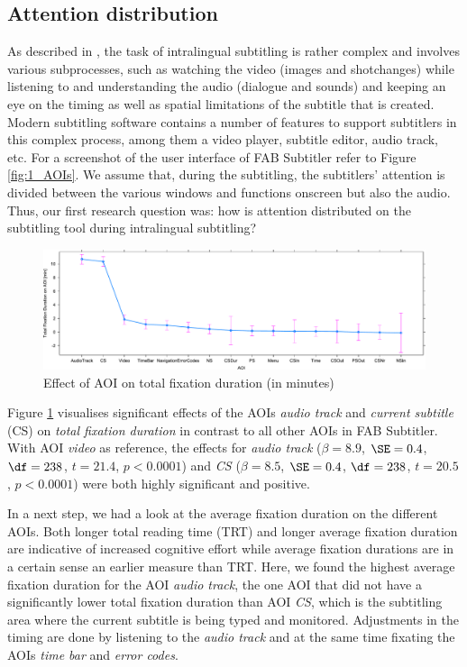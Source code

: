 \documentclass[output=paper]{langscibook}
\begin{document}
\subsection{Attention distribution}
As described in , the task of intralingual subtitling is rather complex and involves various subprocesses, such as watching the video (images and shot\linebreak changes) while listening to and understanding the audio (dialogue and sounds) and keeping an eye on the timing as well as spatial limitations of the subtitle that is created.
Modern subtitling software contains a number of features to support subtitlers in this complex process, among them a video player, subtitle editor, audio track, etc.
For a screenshot of the user interface of FAB Subtitler refer to Figure \ref{fig:1_AOIs}.
We assume that, during the subtitling, the subtitlers' attention is divided between the various windows and functions onscreen but also the audio.
Thus, our first research question was: how is attention distributed on the subtitling tool during intralingual subtitling?

\begin{figure}
\includegraphics[width=1\textwidth]{figures/LME1_TotalFixDur_AOI.pdf}
%
\caption{Effect of AOI on total fixation duration (in minutes)\label{fig:3_LME5}}
\end{figure}

Figure \ref{fig:3_LME5} visualises significant effects of the AOIs \textit{audio track} and \textit{current subtitle} (CS) on \textit{total fixation duration} in contrast to all other AOIs in FAB Subtitler.
With AOI \textit{video} as reference, the effects for \textit{audio track} ($\beta=8.9$, $\SE=0.4$, $\df=238$, $t=21.4$, $p<0.0001$) and \textit{CS} ($\beta=8.5$, $\SE=0.4$, $\df=238$, $t=20.5$, $p<0.0001$) were both highly significant and positive.

In a next step, we had a look at the average fixation duration on the different AOIs.
Both longer total reading time (TRT) and longer average fixation duration are indicative of increased cognitive effort while average fixation durations are in a certain sense an earlier measure than TRT.
Here, we found the highest average fixation duration for the AOI \textit{audio track}, the one AOI that did not have a significantly lower total fixation duration than AOI \textit{CS}, which is the subtitling area where the current subtitle is being typed and monitored.
Adjustments in the timing are done by listening to the \textit{audio track} and at the same time fixating the AOIs \textit{time bar} and \textit{error codes}.
\end{document}
